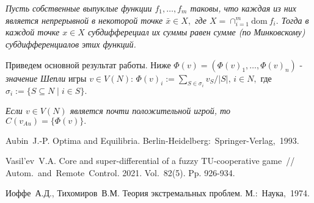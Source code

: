  \cite{IT74} {\it Пусть собственные
выпуклые функции $f_1, \ldots, f_m$ таковы, что каждая из них
является непрерывной в некоторой точке $\bar{x} \in X,$ где $X =
\cap_{i=1}^m \mbox{dom}~f_i.$ Тогда в каждой точке $x \in X$
субдифферециал их суммы равен сумме (по Минковскому)
субдифференциалов этих функций.}

Приведем основной результат работы. Ниже $\Phi(v) = (\Phi(v)_1, \ldots, \Phi(v)_n)$ - {\it значение Шепли} игры $v \in V(N)$: $\Phi(v)_i := \sum_{S \in \sigma_i}v_S/|S|, \, i \in N,$ где $\sigma_i := \{S \subseteq N \mid i \in S\}.$

 {\it Если $v \in V(N)$ является почти по\-ло\-жи\-тель\-ной игрой, то $C(v_{Au}) = \{\Phi(v)\}.$}



%

%

\begin{thebibliography}{9} %

Aubin~J.-P. Optima and Equilibria. Berlin-Heidelberg:~Springer-Verlag,~1993.

Vasil'ev~V.A. Core and super-differential of a fuzzy TU-cooperative game~// Autom.~and~Remote~Control. 2021. Vol.~82(5). Pp. 926-934.

Иоффе~А.Д., Тихомиров~В.М. Теория экстремальных проблем. М.:~Наука,~1974.

\end{thebibliography}





%